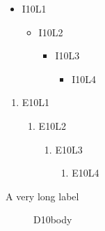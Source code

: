 \documentclass[10pt]{article}
\begin{document}
\begin{itemize}
\item I10L1
  \begin{itemize}
  \item I10L2
    \begin{itemize}
    \item I10L3
      \begin{itemize}
      \item I10L4
      \end{itemize}
    \end{itemize}
  \end{itemize}
\end{itemize}
\newpage
\begin{enumerate}
\item E10L1
  \begin{enumerate}
  \item E10L2
    \begin{enumerate}
    \item E10L3
      \begin{enumerate}
      \item E10L4
      \end{enumerate}
    \end{enumerate}
  \end{enumerate}
\end{enumerate}
\newpage
\begin{description}
\item[A very long label] D10body
\end{description}
\end{document}
